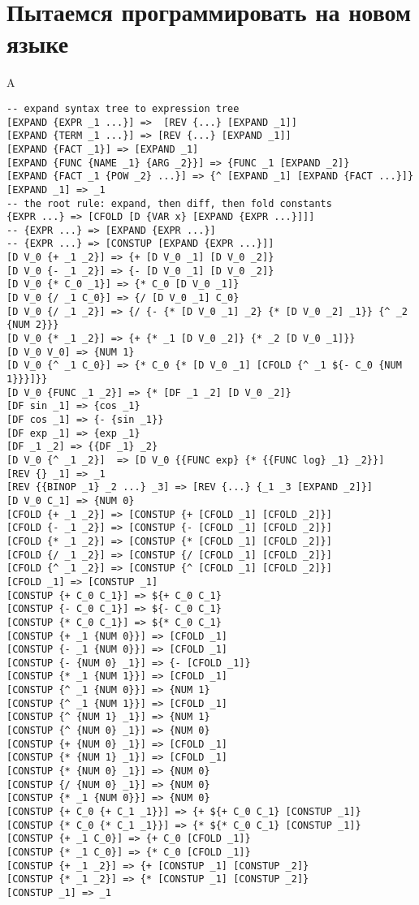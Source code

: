 \documentclass[10pt]{report}
\begin{document}
\section{Пытаемся программировать на новом языке}
A
\begin{lstlisting}[language=rules]
-- expand syntax tree to expression tree
[EXPAND {EXPR _1 ...}] =>  [REV {...} [EXPAND _1]]
[EXPAND {TERM _1 ...}] => [REV {...} [EXPAND _1]]
[EXPAND {FACT _1}] => [EXPAND _1]
[EXPAND {FUNC {NAME _1} {ARG _2}}] => {FUNC _1 [EXPAND _2]}
[EXPAND {FACT _1 {POW _2} ...}] => {^ [EXPAND _1] [EXPAND {FACT ...}]}
[EXPAND _1] => _1
-- the root rule: expand, then diff, then fold constants
{EXPR ...} => [CFOLD [D {VAR x} [EXPAND {EXPR ...}]]]
-- {EXPR ...} => [EXPAND {EXPR ...}]
-- {EXPR ...} => [CONSTUP [EXPAND {EXPR ...}]]
[D V_0 {+ _1 _2}] => {+ [D V_0 _1] [D V_0 _2]}
[D V_0 {- _1 _2}] => {- [D V_0 _1] [D V_0 _2]}
[D V_0 {* C_0 _1}] => {* C_0 [D V_0 _1]}
[D V_0 {/ _1 C_0}] => {/ [D V_0 _1] C_0}
[D V_0 {/ _1 _2}] => {/ {- {* [D V_0 _1] _2} {* [D V_0 _2] _1}} {^ _2 {NUM 2}}}
[D V_0 {* _1 _2}] => {+ {* _1 [D V_0 _2]} {* _2 [D V_0 _1]}}
[D V_0 V_0] => {NUM 1}
[D V_0 {^ _1 C_0}] => {* C_0 {* [D V_0 _1] [CFOLD {^ _1 ${- C_0 {NUM 1}}}]}}
[D V_0 {FUNC _1 _2}] => {* [DF _1 _2] [D V_0 _2]}
[DF sin _1] => {cos _1}
[DF cos _1] => {- {sin _1}}
[DF exp _1] => {exp _1}
[DF _1 _2] => {{DF _1} _2}
[D V_0 {^ _1 _2}]  => [D V_0 {{FUNC exp} {* {{FUNC log} _1} _2}}]
[REV {} _1] => _1
[REV {{BINOP _1} _2 ...} _3] => [REV {...} {_1 _3 [EXPAND _2]}]
[D V_0 C_1] => {NUM 0}
[CFOLD {+ _1 _2}] => [CONSTUP {+ [CFOLD _1] [CFOLD _2]}]
[CFOLD {- _1 _2}] => [CONSTUP {- [CFOLD _1] [CFOLD _2]}]
[CFOLD {* _1 _2}] => [CONSTUP {* [CFOLD _1] [CFOLD _2]}]
[CFOLD {/ _1 _2}] => [CONSTUP {/ [CFOLD _1] [CFOLD _2]}]
[CFOLD {^ _1 _2}] => [CONSTUP {^ [CFOLD _1] [CFOLD _2]}]
[CFOLD _1] => [CONSTUP _1]
[CONSTUP {+ C_0 C_1}] => ${+ C_0 C_1}
[CONSTUP {- C_0 C_1}] => ${- C_0 C_1}
[CONSTUP {* C_0 C_1}] => ${* C_0 C_1}
[CONSTUP {+ _1 {NUM 0}}] => [CFOLD _1]
[CONSTUP {- _1 {NUM 0}}] => [CFOLD _1]
[CONSTUP {- {NUM 0} _1}] => {- [CFOLD _1]}
[CONSTUP {* _1 {NUM 1}}] => [CFOLD _1]
[CONSTUP {^ _1 {NUM 0}}] => {NUM 1}
[CONSTUP {^ _1 {NUM 1}}] => [CFOLD _1]
[CONSTUP {^ {NUM 1} _1}] => {NUM 1}
[CONSTUP {^ {NUM 0} _1}] => {NUM 0}
[CONSTUP {+ {NUM 0} _1}] => [CFOLD _1]
[CONSTUP {* {NUM 1} _1}] => [CFOLD _1]
[CONSTUP {* {NUM 0} _1}] => {NUM 0}
[CONSTUP {/ {NUM 0} _1}] => {NUM 0}
[CONSTUP {* _1 {NUM 0}}] => {NUM 0}
[CONSTUP {+ C_0 {+ C_1 _1}}] => {+ ${+ C_0 C_1} [CONSTUP _1]}
[CONSTUP {* C_0 {* C_1 _1}}] => {* ${* C_0 C_1} [CONSTUP _1]}
[CONSTUP {+ _1 C_0}] => {+ C_0 [CFOLD _1]}
[CONSTUP {* _1 C_0}] => {* C_0 [CFOLD _1]}
[CONSTUP {+ _1 _2}] => {+ [CONSTUP _1] [CONSTUP _2]}
[CONSTUP {* _1 _2}] => {* [CONSTUP _1] [CONSTUP _2]}
[CONSTUP _1] => _1

\end{lstlisting}
\appendix
\end{document}
